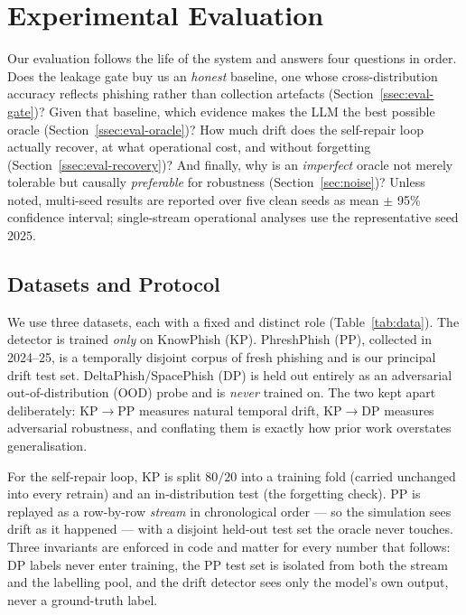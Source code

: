 
\section{Experimental Evaluation}
\label{sec:eval}

Our evaluation follows the life of the system and answers four questions in
order. Does the leakage gate buy us an \emph{honest} baseline, one whose
cross-distribution accuracy reflects phishing rather than collection artefacts
(Section~\ref{ssec:eval-gate})? Given that baseline, which evidence makes the
LLM the best possible oracle (Section~\ref{ssec:eval-oracle})? How much drift
does the self-repair loop actually recover, at what operational cost, and
without forgetting (Section~\ref{ssec:eval-recovery})? And finally, why is an
\emph{imperfect} oracle not merely tolerable but causally \emph{preferable} for
robustness (Section~\ref{sec:noise})? Unless noted, multi-seed results are
reported over five clean seeds as mean $\pm$ 95\% confidence interval;
single-stream operational analyses use the representative seed $2025$.

\subsection{Datasets and Protocol}
\label{ssec:eval-data}

We use three datasets, each with a fixed and distinct role
(Table~\ref{tab:data}). The detector is trained \emph{only} on KnowPhish (KP).
PhreshPhish (PP), collected in 2024--25, is a temporally disjoint corpus of
fresh phishing and is our principal drift test set. DeltaPhish/SpacePhish (DP)
is held out entirely as an adversarial out-of-distribution (OOD) probe and is
\emph{never} trained on. The two kept apart deliberately: KP$\to$PP measures
natural temporal drift, KP$\to$DP measures adversarial robustness, and conflating
them is exactly how prior work overstates generalisation.

For the self-repair loop, KP is split $80/20$ into a training fold (carried
unchanged into every retrain) and an in-distribution test (the forgetting
check). PP is replayed as a row-by-row \emph{stream} in chronological order ---
so the simulation sees drift as it happened --- with a disjoint held-out test
set the oracle never touches. Three invariants are enforced in code and matter
for every number that follows: DP labels never enter training, the PP test set
is isolated from both the stream and the labelling pool, and the drift detector
sees only the model's own output, never a ground-truth label.

